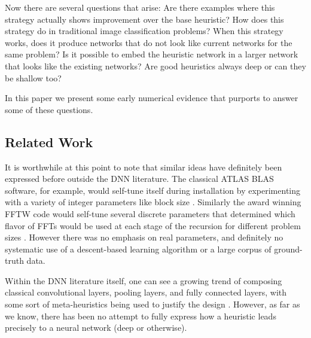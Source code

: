 \documentclass{article}
\begin{document}
Now there are several questions that arise: Are there examples where this strategy actually shows improvement over the base heuristic? How does this strategy do in traditional image classification problems? When this strategy works, does it produce networks that do not look like current networks for the same problem? Is it possible to embed the heuristic network in a larger network that looks like the existing networks? Are good heuristics always deep or can they be shallow too?


In this paper we present some early numerical evidence that purports to answer some of these questions.

\subsection{Related Work}
It is worthwhile at this point to note that similar ideas have definitely been expressed before outside the DNN literature. The classical ATLAS BLAS software, for example, would self-tune itself during installation by experimenting with a variety of integer parameters like block size \cite{demmel2005self}. Similarly the award winning FFTW code would self-tune several discrete parameters that determined which flavor of FFTs would be used at each stage of the recursion for different problem sizes \cite{frigo1998fftw}. However there was no emphasis on real parameters, and definitely no systematic use of a descent-based learning algorithm or a large corpus of ground-truth data.

Within the DNN literature itself, one can see a growing trend of composing classical convolutional layers, pooling layers, and fully connected layers, with some sort of meta-heuristics being used to justify the design \cite{grauman2011learning,han2015matchnet,pinheiro2016learning}. However, as far as we know, there has been no attempt to fully express how a heuristic leads precisely to a neural network (deep or otherwise).
\end{document}
